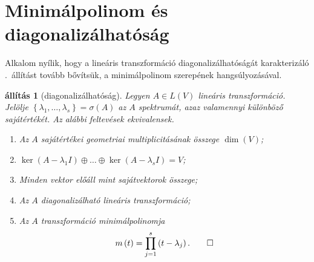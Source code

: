\documentclass[9pt, a4paper, showtrims]{memoir}
\theoremstyle{plain}
\newtheorem{proposition}{állítás}[chapter]
\theoremstyle{remark}
\theoremstyle{definition}
\begin{document}
\section{Minimálpolinom és diagonalizálhatóság}
Alkalom nyílik,
hogy a lineáris transzformáció diagonalizálhatóságát karakterizáló .~állítást
tovább bővítsük, a minimálpolinom szerepének hangsúlyozásával.
\begin{proposition}[diagonalizálhatóság]\label{pr:diagonalizalhatosag}
	Legyen $A\in L\left( V \right)$ lineáris transzformáció.
	Jelölje $\left\{ \lambda_1,\ldots,\lambda_s \right\}=\sigma\left( A \right)$
	az $A$ spektrumát,
	azaz valamennyi különböző sajátértékét.
	Az alábbi feltevések ekvivalensek.
	\begin{enumerate}
		\item Az $A$ sajátértékei geometriai multiplicitásának összege $\dim(V)$;
		\item
		      \begin{math}
			      \ker\left( A-\lambda_1 I \right)\oplus\dots\oplus\ker\left( A-\lambda_s I \right)=V
		      \end{math};
		\item Minden vektor előáll mint sajátvektorok összege;
		\item Az $A$ diagonalizálható lineáris transzformáció;
		\item Az $A$ transzformáció minimálpolinomja
		      \[
			      m\left( t \right)=
			      \prod_{j=1}^s\left( t-\lambda_j \right).
			      \qedhere
		      \]
	\end{enumerate}
\end{proposition}
\end{document}

